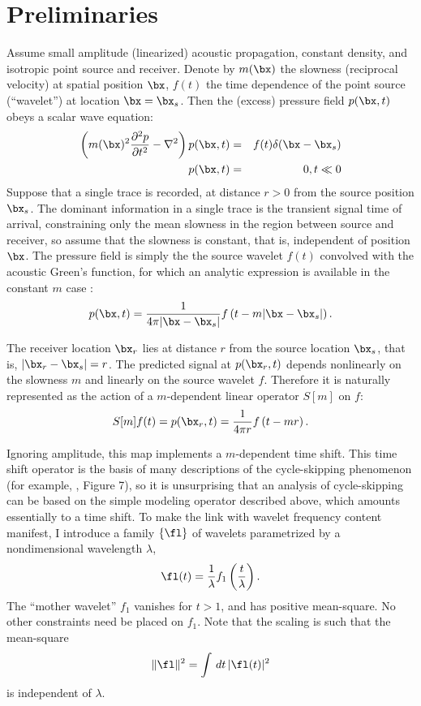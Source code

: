 \section{Preliminaries}
Assume small amplitude (linearized) acoustic propagation, constant
density, and isotropic point source and receiver. Denote by $m(\bx)$
the slowness (reciprocal velocity) at spatial position $\bx$, $f(t)$
the time dependence of the point source (``wavelet'') at location
$\bx=\bx_s$. Then the (excess) pressure field $p(\bx,t)$ obeys a
scalar wave equation:
\begin{eqnarray}
  \label{eqn:awe}
  \left(m(\bx)^2\frac{\partial^2 p}{\partial t^2} - \nabla^2\right) p(\bx,t) &=&
                                                                         f(t)\delta(\bx-\bx_s) \nonumber\\
  p(\bx,t)&=&0, t\ll 0
\end{eqnarray}
Suppose that a single trace is recorded, at distance $r>0$ from the
source position $\bx_s$. The dominant information in a single
trace is the transient signal time of arrival, constraining only the mean slowness in the
region
between source and receiver, so assume that the
slowness is constant, that is, independent of position $\bx$. The pressure field is simply the  the source
wavelet $f(t)$ convolved with the
acoustic Green's function, for which an analytic expression is
available in the constant $m$ case \cite[]{CourHil:62}:
\begin{equation}
  \label{eqn:homsol}
  p(\bx,t) = \frac{1}{4\pi |\bx-\bx_s|}f\left(t-m|\bx-\bx_s|\right).
\end{equation}

The receiver location $\bx_r$ lies at distance $r$ from the source
location $\bx_s$, that is, $|\bx_r-\bx_s|=r$. The predicted signal at
$p(\bx_r,t)$ depends nonlinearly on the slowness $m$ and linearly on the
source wavelet $f$. Therefore it is naturally represented as the
action of a $m$-dependent linear operator $S[m]$ on $f$:
\begin{equation}
\label{eqn:mod}
S[m]f (t)= p(\bx_r,t) = \frac{1}{4\pi r}f\left(t-mr\right).
\end{equation}

Ignoring amplitude, this map implements a $m$-dependent time
shift. This time shift operator is the basis of many descriptions of
the cycle-skipping phenomenon (for example, \cite{VirieuxOperto:09},
Figure 7), so it is unsurprising that an analysis of cycle-skipping
can be based on the simple modeling operator described above, which
amounts essentially to a time shift. To make the link with wavelet
frequency content manifest, I introduce a family $\{\fl\}$ of
wavelets parametrized by a nondimensional wavelength $\lambda$,
\begin{equation}
  \label{eqn:deffl}
  \fl(t) = \frac{1}{\lambda}f_1\left(\frac{t}{\lambda}\right).
\end{equation}
The ``mother wavelet'' $f_1$ vanishes for $t>1$, and has positive
mean-square. No other constraints need be placed on $f_1$. Note that
the scaling is such that the mean-square
\[
  \|\fl\|^2 = \int\,dt\,|\fl(t)|^2
\]
is independent of $\lambda$.

